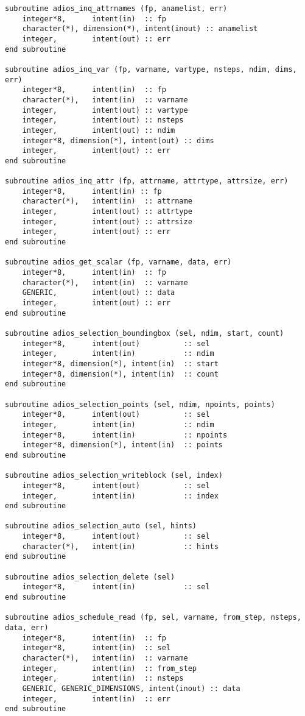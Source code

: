 \begin{lstlisting}[language=ADIOS,alsolanguage=Fortran]
subroutine adios_inq_attrnames (fp, anamelist, err)
    integer*8,      intent(in)  :: fp
    character(*), dimension(*), intent(inout) :: anamelist
    integer,        intent(out) :: err
end subroutine

subroutine adios_inq_var (fp, varname, vartype, nsteps, ndim, dims, err)
    integer*8,      intent(in)  :: fp
    character(*),   intent(in)  :: varname
    integer,        intent(out) :: vartype
    integer,        intent(out) :: nsteps
    integer,        intent(out) :: ndim
    integer*8, dimension(*), intent(out) :: dims
    integer,        intent(out) :: err
end subroutine

subroutine adios_inq_attr (fp, attrname, attrtype, attrsize, err)
    integer*8,      intent(in) :: fp
    character(*),   intent(in)  :: attrname
    integer,        intent(out) :: attrtype
    integer,        intent(out) :: attrsize
    integer,        intent(out) :: err
end subroutine

subroutine adios_get_scalar (fp, varname, data, err)
    integer*8,      intent(in)  :: fp
    character(*),   intent(in)  :: varname
    GENERIC,        intent(out) :: data
    integer,        intent(out) :: err
end subroutine

subroutine adios_selection_boundingbox (sel, ndim, start, count)
    integer*8,      intent(out)          :: sel
    integer,        intent(in)           :: ndim
    integer*8, dimension(*), intent(in)  :: start
    integer*8, dimension(*), intent(in)  :: count
end subroutine

subroutine adios_selection_points (sel, ndim, npoints, points)
    integer*8,      intent(out)          :: sel
    integer,        intent(in)           :: ndim
    integer*8,      intent(in)           :: npoints
    integer*8, dimension(*), intent(in)  :: points
end subroutine

subroutine adios_selection_writeblock (sel, index)
    integer*8,      intent(out)          :: sel
    integer,        intent(in)           :: index
end subroutine

subroutine adios_selection_auto (sel, hints)
    integer*8,      intent(out)          :: sel
    character(*),   intent(in)           :: hints
end subroutine

subroutine adios_selection_delete (sel)
    integer*8,      intent(in)           :: sel
end subroutine

subroutine adios_schedule_read (fp, sel, varname, from_step, nsteps, data, err)
    integer*8,      intent(in)  :: fp
    integer*8,      intent(in)  :: sel
    character(*),   intent(in)  :: varname
    integer,        intent(in)  :: from_step
    integer,        intent(in)  :: nsteps
    GENERIC, GENERIC_DIMENSIONS, intent(inout) :: data
    integer,        intent(in)  :: err
end subroutine


\end{lstlisting}
